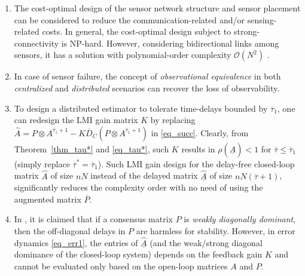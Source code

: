 \documentclass[journal]{IEEEtran}
\def\mc{\mathcal}
\begin{document}
\begin{enumerate}
	\item The cost-optimal design  of the sensor network structure and sensor placement \cite{spl18,pequito2014optimal} can be considered to reduce the communication-related and/or sensing-related costs. In general, the cost-optimal design  subject to strong-connectivity is NP-hard. However, considering bidirectional links among sensors, it has a solution with polynomial-order complexity $\mc{O}(N^2)$ \cite{spl18}. 
	\item In case of sensor failure, the concept of \textit{observational equivalence} in both \textit{centralized} \cite{commault2018classification} and \textit{distributed} \cite{icassp2016} scenarios can recover the loss of observability.
	\item To design a distributed estimator to tolerate time-delays bounded by $\overline{\tau}_1$, one can redesign the LMI gain matrix $K$ by replacing $\widehat{A}= P\otimes A^{\overline{\tau}_1+1} - K \overline{D}_C (P\otimes A^{\overline{\tau}_1+1})$ in \eqref{eq_succ}. Clearly, from Theorem~\ref{thm_tau*} and \eqref{eq_tau*}, such $K$ results in $\rho(\underline{\widehat{A}})<1$ for $\overline{\tau}\leq \overline{\tau}_1$ (simply replace $\overline{\tau}^*=\overline{\tau}_1$). Such LMI gain design for the delay-free closed-loop matrix $\widehat{A}$ of size $nN$ instead of the delayed  matrix $\underline{\widehat{A}}$ of size $nN(\overline{\tau}+1)$, significantly reduces the  complexity order  with no need of using the augmented matrix $\overline{P}$.
	\item In \cite[Theorem 1]{HOFBAUER},  it is claimed that if a consensus matrix $P$ is \textit{weakly diagonally dominant}, then the off-diagonal delays in $P$ are harmless for stability. However, in error dynamics \eqref{eq_err1}, the entries of $\underline{\widehat{A}}$ (and the weak/strong diagonal dominance of the closed-loop system) depends on the feedback gain $K$ and cannot be evaluated only based on the open-loop matrices $A$ and $P$. 
\end{enumerate}
%
\end{document}

